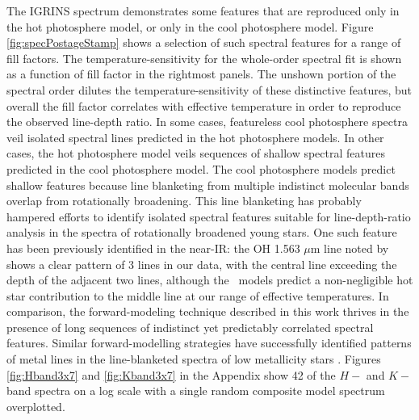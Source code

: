 \documentclass[twocolumn]{emulateapj}%
\begin{document}
The IGRINS spectrum demonstrates some features that are reproduced only in the hot photosphere model, or only in the cool photosphere model.  Figure \ref{fig:specPostageStamp} shows a selection of such spectral features for a range of fill factors.  The temperature-sensitivity for the whole-order spectral fit is shown as a function of fill factor in the rightmost panels.  The unshown portion of the spectral order dilutes the temperature-sensitivity of these distinctive features, but overall the fill factor correlates with effective temperature in order to reproduce the observed line-depth ratio.  In some cases, featureless cool photosphere spectra veil isolated spectral lines predicted in the hot photosphere models.  In other cases, the hot photosphere model veils sequences of shallow spectral features predicted in the cool photosphere model.  The cool photosphere models predict shallow features because line blanketing from multiple indistinct molecular bands overlap from rotationally broadening.  This line blanketing has probably hampered efforts to identify isolated spectral features suitable for line-depth-ratio analysis in the spectra of rotationally broadened young stars.  One such feature has been previously identified in the near-IR: the OH 1.563 $\mu$m line noted by \citet{oneal01} shows a clear pattern of 3 lines in our data, with the central line exceeding the depth of the adjacent two lines, although the \PHOENIX\ models predict a non-negligible hot star contribution to the middle line at our range of effective temperatures.  In comparison, the forward-modeling technique described in this work thrives in the presence of long sequences of indistinct yet predictably correlated spectral features.  Similar forward-modelling strategies have successfully identified patterns of metal lines in the line-blanketed spectra of low metallicity stars \citep{kirby11,kirby15}.  Figures \ref{fig:Hband3x7} and \ref{fig:Kband3x7} in the Appendix show 42 of the $H-$ and $K-$band spectra on a log scale with a single random composite model spectrum overplotted.  
\end{document}
